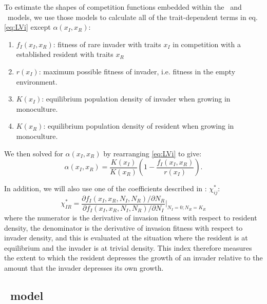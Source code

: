 \documentclass[a4paper,11pt]{article}
\begin{document}
To estimate the shapes of competition functions embedded within the \Rstar\
and \plant\ models, we use those models to calculate all of the trait-dependent
terms in eq. \ref{eq:LVi} except $\alpha(x_I, x_R)$:
\begin{enumerate}
\item $f_I(x_I, x_R)$: fitness of rare invader with traits $x_I$  in
  competition with a established resident with traits $x_R$
\item $r(x_I)$: maximum possible fitness of invader, i.e. fitness in
  the empty environment.
\item $K(x_I)$: equilibrium population density of invader when growing
  in monoculture.
\item $K(x_R)$: equilibrium population density of resident when
  growing in monoculture.
\end{enumerate}
We then solved for $\alpha(x_I, x_R)$ by rearranging  \ref{eq:LVi} to give:
\begin{equation}
  \label{eq:alpha}
  \alpha(x_I, x_R) = \frac{K(x_I)}{K(x_R)}
  \left(1 - \frac{f_I(x_I, x_R)}{r(x_I)}\right).
\end{equation}

In addition, we will also use one of the coefficients described in
\citet{Abrams-2008}: $\chi_{ij}^{*}$:
%
\begin{equation}
  \label{eq:abrams-coef}
  \chi_{IR}^{*} =
  \frac{\partial f_I(x_I, x_R, N_I, N_R) /  \partial N_R}%
  {\partial f_I(x_I, x_R, N_I, N_R) / \partial N_I}
  \bigg|_{N_I=0; N_R=K_{R}}
\end{equation}
%
where the numerator is the derivative of invasion fitness with respect
to resident density, the denominator is the derivative of invasion
fitness with respect to invader density, and this is evaluated at the
situation where the resident is at equilibrium and the invader is at
trivial density.  This index therefore measures the extent to which
the resident depresses the growth of an invader relative to the amount
that the invader depresses its own growth.

\subsection{\Rstar\ model}

\end{document}
